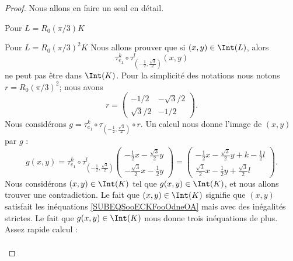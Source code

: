 \begin{proof}
    Nous allons en faire un seul en détail.
    \begin{subproof}
        \item[Pour \( L=R_0(\pi/3)K\)]
        \item[Pour \( L=R_0(\pi/3)^2K\)]
            Nous allons prouver que si \( (x,y)\in \Int(L)\), alors
            \begin{equation}
                \tau_{e_1}^k\circ \tau_{(-\frac{ 1 }{2},\frac{ \sqrt{ 3 } }{2})}^l(x,y)
            \end{equation}
            ne peut pas être dans \( \Int(K)\). Pour la simplicité des notations nous notons \( r=R_0(\pi/3)^2\); nous avons
            \begin{equation}
                r=\begin{pmatrix}
                    -1/2    &   -\sqrt{ 3 }/2    \\ 
                    \sqrt{ 3 }/2    &   -1/2    
                \end{pmatrix}.
            \end{equation}
            Nous considérons \( g=\tau_{e_1}^k\circ\tau_{(-\frac{ 1 }{2},\frac{ \sqrt{ 3 } }{2})}\circ r\). Un calcul nous donne l'image de \( (x,y)\) par \( g\) :
            \begin{equation}
                g(x,y)=\tau_{e_1}^k\circ\tau_{(-\frac{ 1 }{2},\frac{ \sqrt{ 3 } }{2})}^l\begin{pmatrix}
                    -\frac{ 1 }{2}x-\frac{ \sqrt{ 3 } }{2}y   \\
                    -\frac{ \sqrt{ 3 } }{2}x-\frac{ 1 }{2}y    
                \end{pmatrix}=\begin{pmatrix}
                    -\frac{ 1 }{2}x-\frac{ \sqrt{ 3 } }{2}y+k-\frac{ 1 }{2}l    \\ 
                    \frac{ \sqrt{ 3 } }{2}x-\frac{ 1 }{2}y+\frac{ \sqrt{ 3 } }{2}l    
                \end{pmatrix}.
            \end{equation}
            Nous considérons \( (x,y)\in \Int(K)\) tel que \( g(x,y)\in \Int(K)\), et nous allons trouver une contradiction. Le fait que \( (x,y)\in \Int(K)\) signifie que \( (x,y)\) satisfait les inéquations \eqref{SUBEQSooECKFooOdneOA} mais avec des inégalités strictes. Le fait que \( g(x,y)\in\Int(K)\) nous donne trois inéquations de plus. Assez rapide calcul :
            \begin{subequations}
                \begin{align}

\end{align}
\end{subequations}
\end{subproof}
\end{proof}
